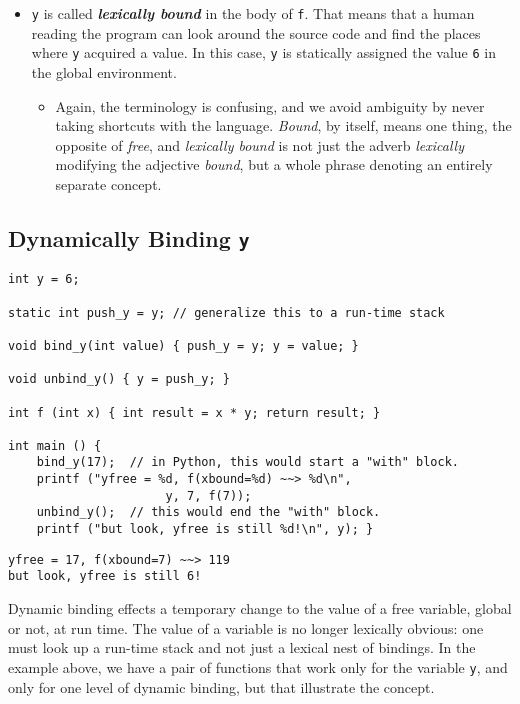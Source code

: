 \documentclass[10pt,oneside,x11names]{article}
\begin{document}
\begin{itemize}
\item \texttt{y} is called \textbf{\emph{lexically bound}} in the body of \texttt{f}. That means
that a human reading the program can look around the source code
and find the places where \texttt{y} acquired a value. In this case,
\texttt{y} is statically assigned the value \texttt{6} in the global
environment.

\begin{itemize}
\item Again, the terminology is confusing, and we avoid ambiguity by
never taking shortcuts with the language. \emph{Bound}, by itself,
means one thing, the opposite of \emph{free}, and \emph{lexically bound}
is not just the adverb \emph{lexically} modifying the adjective
\emph{bound}, but a whole phrase denoting an entirely separate
concept.
\end{itemize}
\end{itemize}

\subsection{Dynamically Binding \texttt{y}}
\label{sec:org0521e28}

\vskip 0.26cm
\begin{verbatim}
int y = 6;

static int push_y = y; // generalize this to a run-time stack

void bind_y(int value) { push_y = y; y = value; }

void unbind_y() { y = push_y; }

int f (int x) { int result = x * y; return result; }

int main () {
    bind_y(17);  // in Python, this would start a "with" block.
    printf ("yfree = %d, f(xbound=%d) ~~> %d\n",
                      y, 7, f(7));
    unbind_y();  // this would end the "with" block.
    printf ("but look, yfree is still %d!\n", y); }
\end{verbatim}

\begin{verbatim}
yfree = 17, f(xbound=7) ~~> 119
but look, yfree is still 6!
\end{verbatim}


Dynamic binding effects a temporary change to the value of a free
variable, global or not, at run time. The value of a variable is
no longer lexically obvious: one must look up a run-time stack and
not just a lexical nest of bindings. In the example above, we have
a pair of functions that work only for the variable \texttt{y}, and only
for one level of dynamic binding, but that illustrate the concept.
\end{document}

